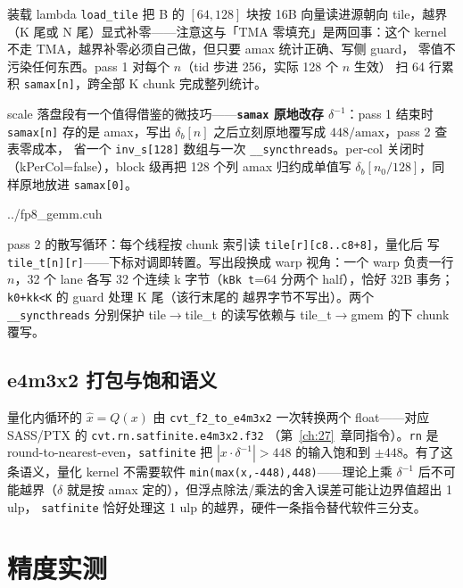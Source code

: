 装载 lambda \texttt{load\_tile} 把 B 的 $[64,128]$ 块按 16B 向量读进源朝向
tile，越界（K 尾或 N 尾）显式补零——注意这与「TMA 零填充」是两回事：这个
kernel 不走 TMA，越界补零必须自己做，但只要 amax 统计正确、写侧 guard，
零值不污染任何东西。pass 1 对每个 $n$（tid 步进 256，实际 128 个 $n$ 生效）
扫 64 行累积 \texttt{samax[n]}，跨全部 K chunk 完成整列统计。

scale 落盘段有一个值得借鉴的微技巧——\textbf{\texttt{samax} 原地改存
$\delta^{-1}$}：pass 1 结束时 \texttt{samax[n]} 存的是 amax，写出
$\delta_b[n]$ 之后立刻原地覆写成 $448/\mathrm{amax}$，pass 2 查表零成本，
省一个 \texttt{inv\_s[128]} 数组与一次 \texttt{\_\_syncthreads}。per-col
关闭时（kPerCol=false），block 级再把 128 个列 amax 归约成单值写
$\delta_b[n_0/128]$，同样原地放进 \texttt{samax[0]}。

\begin{lstinputlisting}[linerange={266-288},firstnumber=auto,
  title={fp8\_gemm.cuh L266-288（pass 2：量化散写 tile\_t + 32B coalesced 写出）}]{../fp8_gemm.cuh}
\end{lstinputlisting}

pass 2 的散写循环：每个线程按 chunk 索引读 \texttt{tile[r][c8..c8+8]}，量化后
写 \texttt{tile\_t[n][r]}——下标对调即转置。写出段换成 warp 视角：一个 warp
负责一行 $n$，32 个 lane 各写 32 个连续 k 字节（\texttt{kBk t}=64 分两个
half），恰好 32B 事务；\texttt{k0+kk<K} 的 guard 处理 K 尾（该行末尾的
越界字节不写出）。两个 \texttt{\_\_syncthreads} 分别保护
tile$\to$tile\_t 的读写依赖与 tile\_t$\to$gmem 的下 chunk 覆写。

\subsection{e4m3x2 打包与饱和语义}

量化内循环的 $\hat{x}=Q(x)$ 由 \texttt{cvt\_f2\_to\_e4m3x2} 一次转换两个
float——对应 SASS/PTX 的
\texttt{cvt.rn.\allowbreak satfinite.\allowbreak e4m3x2.\allowbreak f32}
（第~\ref{ch:27}~章同指令）。\texttt{rn}
是 round-to-nearest-even，\texttt{satfinite} 把 $|x\cdot\delta^{-1}|>448$
的输入饱和到 $\pm448$。有了这条语义，量化 kernel 不需要软件
\texttt{min(max(x,-448),448)}——理论上乘 $\delta^{-1}$ 后不可能越界（$\delta$
就是按 amax 定的），但浮点除法/乘法的舍入误差可能让边界值超出 1 ulp，
\texttt{satfinite} 恰好处理这 1 ulp 的越界，硬件一条指令替代软件三分支。

\section{精度实测}\label{sec:34-acc}

